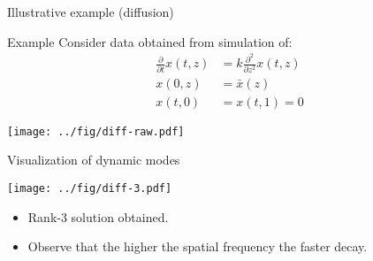 \documentclass[10pt]{beamer}
\newcommand{\blue}{\color{blue}}
\begin{document}
\begin{frame}{Illustrative example (diffusion)}
  \begin{block}{Example}
    Consider {\blue data} obtained from simulation of:
    \begin{align*}
      \frac{\partial}{\partial t} {x}(t,z) &= k\frac{\partial^2}{\partial z^2} {x}(t,z)\tag{diffusion equation}\\
      {x}(0,z)&=\bar{{x}}(z)\tag{initial condition}\\
      {x}(t,0)&={x}(t,1)=0\tag{boundary condition}
    \end{align*}
  \end{block}
  \centering
  
  \texttt{[image: ../fig/diff-raw.pdf]}
\end{frame}

\begin{frame}{Visualization of dynamic modes}
  \begin{center}
    \texttt{[image: ../fig/diff-3.pdf]}
  \end{center}
  \begin{itemize}
  \item Rank-3 solution obtained.
    \vspace{0.1in}
  \item Observe that the higher the spatial frequency the faster decay.
    \vspace{0.1in}
  \end{itemize}
\end{frame}
\end{document}
